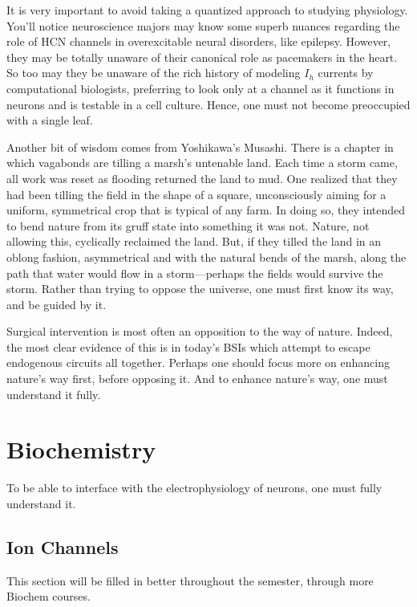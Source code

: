 \documentclass[12pt]{report}
\begin{document}
It is very important to avoid taking a quantized approach to studying physiology. You'll notice neuroscience majors may know some superb nuances regarding the role of HCN channels in overexcitable neural disorders, like epilepsy. However, they may be totally unaware of their canonical role as pacemakers in the heart. So too may they be unaware of the rich history of modeling $I_h$ currents by computational biologists, preferring to look only at a channel as it functions in neurons and is testable in a cell culture. Hence, one must not become preoccupied with a single leaf.\newline

Another bit of wisdom comes from Yoshikawa's Musashi. There is a chapter in which vagabonds are tilling a marsh's untenable land. Each time a storm came, all work was reset as flooding returned the land to mud. One realized that they had been tilling the field in the shape of a square, unconsciously aiming for a uniform, symmetrical crop that is typical of any farm. In doing so, they intended to bend nature from its gruff state into something it was not. Nature, not allowing this, cyclically reclaimed the land. But, if they tilled the land in an oblong fashion, asymmetrical and with the natural bends of the marsh, along the path that water would flow in a storm---perhaps the fields would survive the storm. Rather than trying to oppose the universe, one must first know its way, and be guided by it.\newline

Surgical intervention is most often an opposition to the way of nature. Indeed, the most clear evidence of this is in today's BSIs which attempt to escape endogenous circuits all together. Perhaps one should focus more on enhancing nature's way first, before opposing it. And to enhance nature's way, one must understand it fully. 

\chapter{Biochemistry}

To be able to interface with the electrophysiology of neurons, one must fully understand it. 

\section{Ion Channels}


This section will be filled in better throughout the semester, through more Biochem courses. 
\end{document}
